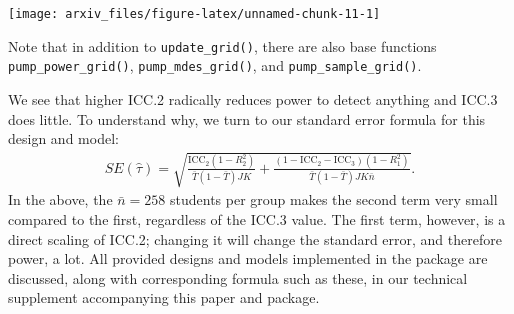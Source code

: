 \documentclass{article}
\newenvironment{Shaded}{\begin{snugshade}}{\end{snugshade}}
\newcommand{\AttributeTok}[1]{\textcolor[rgb]{0.77,0.63,0.00}{#1}}
\newcommand{\DecValTok}[1]{\textcolor[rgb]{0.00,0.00,0.81}{#1}}
\newcommand{\FloatTok}[1]{\textcolor[rgb]{0.00,0.00,0.81}{#1}}
\newcommand{\FunctionTok}[1]{\textcolor[rgb]{0.00,0.00,0.00}{#1}}
\newcommand{\NormalTok}[1]{#1}
\newcommand{\OtherTok}[1]{\textcolor[rgb]{0.56,0.35,0.01}{#1}}
\newcommand{\SpecialCharTok}[1]{\textcolor[rgb]{0.00,0.00,0.00}{#1}}
\newcommand{\StringTok}[1]{\textcolor[rgb]{0.31,0.60,0.02}{#1}}
\begin{document}
\begin{Shaded}
\end{Shaded}

\begin{center}\texttt{[image: arxiv\_files/figure-latex/unnamed-chunk-11-1]} \end{center}

Note that in addition to \texttt{update\_grid()}, there are also base
functions \texttt{pump\_power\_grid()}, \texttt{pump\_mdes\_grid()}, and
\texttt{pump\_sample\_grid()}.

We see that higher ICC.2 radically reduces power to detect anything and
ICC.3 does little. To understand why, we turn to our standard error
formula for this design and model: \[
\begin{aligned}
SE( \hat{\tau} ) = \sqrt{
\frac{\text{ICC}_{2}(1 - R^2_{2})}{\bar{T}(1 - \bar{T}) JK} +
\frac{(1-\text{ICC}_{2} - \text{ICC}_{3})(1-R^2_{1})}{\bar{T}(1 - \bar{T}) J K\bar{n}} } .
\end{aligned}
\] In the above, the \(\bar{n} = 258\) students per group makes the
second term very small compared to the first, regardless of the ICC.3
value. The first term, however, is a direct scaling of ICC.2; changing
it will change the standard error, and therefore power, a lot. All
provided designs and models implemented in the package are discussed,
along with corresponding formula such as these, in our technical
supplement accompanying this paper and package.
\end{document}

